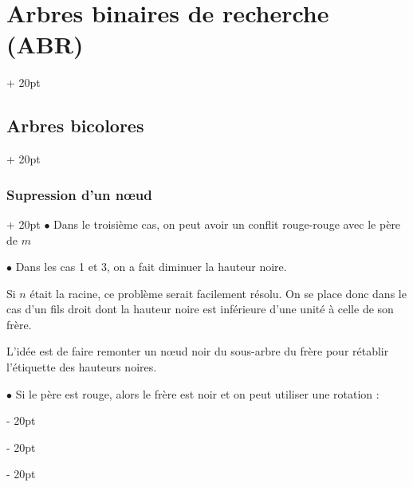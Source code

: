 \documentclass[a4paper, 12pt, twoside]{article}
\newcommand{\ind}[1][20pt]{\advance\leftskip + #1}
\newcommand{\deind}[1][20pt]{\advance\leftskip - #1}
\newenvironment{indt}[2][20pt]{#2 \par \ind[#1]}{\par \deind} %
\begin{document}
\begin{indt}{\section{Arbres binaires de recherche (ABR)}}
\begin{indt}{\subsection{Arbres bicolores}}
\begin{indt}{\subsubsection{Supression d'un n\oe ud}}
                $\bullet$ Dans le troisième cas, on peut avoir un conflit rouge-rouge avec le père de $m$
                
                \vspace{6pt}
                
                $\bullet$ Dans les cas 1 et 3, on a fait diminuer la hauteur noire.
                
                Si $n$ était la racine, ce problème serait facilement résolu. On se place donc dans le cas d'un fils droit dont la hauteur noire est inférieure d'une unité à celle de son frère.
                
                L'idée est de faire remonter un n\oe ud noir du sous-arbre du frère pour rétablir l'étiquette des hauteurs noires.
                
                \vspace{6pt}
                
                $\bullet$ Si le père est rouge, alors le frère est noir et on peut utiliser une rotation :
                

\end{indt}
\end{indt}
\end{indt}
\end{document}
